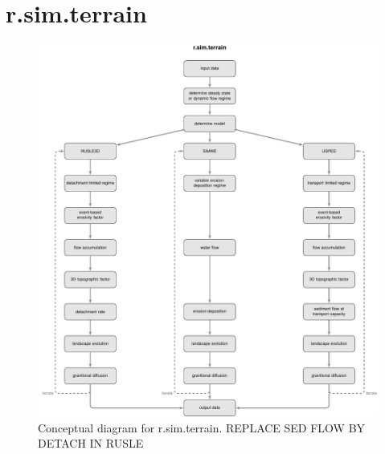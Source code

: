 \documentclass[gmd, manuscript]{copernicus}
\begin{document}
\section{r.sim.terrain}


\begin{figure}%
\center
\includegraphics[width=\textwidth,keepaspectratio]{figures/concept.pdf}
\caption{Conceptual diagram for r.sim.terrain. REPLACE SED FLOW BY DETACH IN RUSLE}
\label{fig:evolution}
\end{figure}

\end{document}
